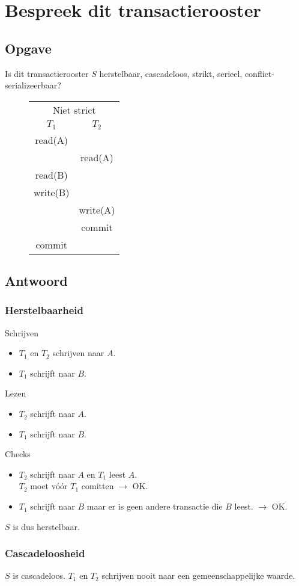 \documentclass[transacties.tex]{subfiles}
\begin{document}
\section{Bespreek dit transactierooster}
\subsection*{Opgave}
Is dit transactierooster $S$ herstelbaar, cascadeloos, strikt, serieel, conflict-serializeerbaar?
\begin{figure}[H]
\centering
\begin{tabular}{c|c}
\multicolumn{2}{c}{Niet strict}\\
$T_1$&$T_2$\\
\hline
read(A) &\\
& read(A)\\
read(B)&\\
write(B)&\\
&write(A)\\
&commit\\
commit&
\end{tabular}
\end{figure}
\subsection*{Antwoord}
\subsubsection*{Herstelbaarheid}
Schrijven
\begin{itemize}
\item $T_1$ en $T_2$ schrijven naar $A$.
\item $T_1$ schrijft naar $B$.
\end{itemize}
Lezen
\begin{itemize}
\item $T_2$ schrijft naar $A$.
\item $T_1$ schrijft naar $B$.
\end{itemize}
Checks
\begin{itemize}
\item $T_2$ schrijft naar $A$ en $T_1$ leest $A$.\\
$T_2$ moet v\'o\'or $T_1$ comitten $\rightarrow$ OK.
\item $T_1$ schrijft naar $B$ maar er is geen andere transactie die $B$ leest. $\rightarrow$ OK.
\end{itemize}
$S$ is dus herstelbaar.
\subsubsection*{Cascadeloosheid}
$S$ is cascadeloos. $T_1$ en $T_2$ schrijven nooit naar een gemeenschappelijke waarde.
\end{document}
